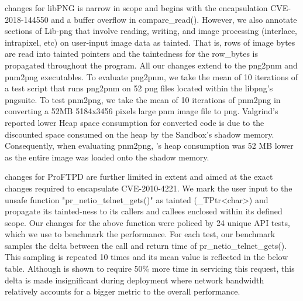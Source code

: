 \systemname changes for libPNG is narrow in scope and begins with the encapsulation CVE-2018-144550 and a buffer overflow in compare\_read(). However, we also annotate sections of Lib-png that involve reading, writing, and image processing (interlace, intrapixel, etc) on user-input image data as tainted. That is, rows of image bytes are read into tainted pointers and the taintedness for the row\_bytes is propagated throughout the program. All our changes extend to the png2pnm and pnm2png executables. To evaluate png2pnm, we take the mean of 10 iterations of a test script that runs png2pnm on 52 png files located within the libpng's pngsuite. To test pnm2png, we take the mean of 10 iterations of pnm2png in converting a 52MB 5184x3456 pixels large pnm image file to png. Valgrind's reported lower Heap space consumption for \systemname converted code is due to the discounted space consumed on the heap by the Sandbox's shadow memory. Consequently, when evaluating pnm2png, \systemname's heap consumption was 52 MB lower as the entire image was loaded onto the shadow memory.  

\systemname changes for ProFTPD are further limited in extent and aimed at the exact changes required to encapsulate CVE-2010-4221. We mark the user input to the unsafe function "pr\_netio\_telnet\_gets()" as tainted (\_TPtr<char>) and propagate its tainted-ness to its callers and callees enclosed within its defined scope. Our changes for the above function were policed by 24 unique API tests, which we use to benchmark the performance. For each test, our benchmark samples the delta between the call and return time of pr\_netio\_telnet\_gets(). This sampling is repeated 10 times and its mean value is reflected in the below table. Although \systemname is shown to require 50\% more time in servicing this request, this delta is made insignificant during deployment where network bandwidth relatively accounts for a bigger metric to the overall performance.

